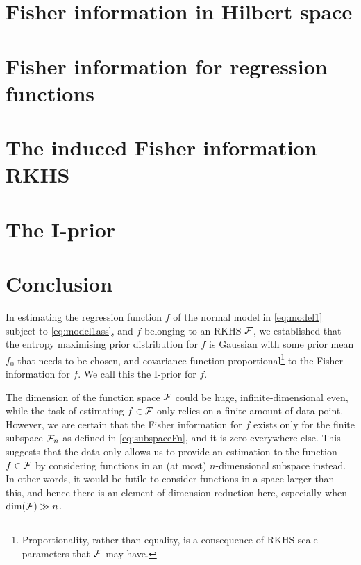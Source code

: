 \documentclass[a4paper,showframe,11pt]{report}
\begin{document}
\section{Fisher information in Hilbert space}
\label{sec:fihilbert}

%

\section{Fisher information for regression functions}
\label{sec:firegfun}


\section{The induced Fisher information RKHS}
\label{sec:inducedFisherRKHS}


\section{The I-prior}


\section{Conclusion}

In estimating the regression function $f$ of the normal model in \cref{eq:model1} subject to \cref{eq:model1ass}, and $f$ belonging to an RKHS ${\mathcal F}$, we established that the entropy maximising prior distribution for $f$ is Gaussian with some prior mean $f_0$ that needs to be chosen, and covariance function proportional\footnote{Proportionality, rather than equality, is a consequence of RKHS scale parameters that ${\mathcal F}$ may have.} to the Fisher information for $f$.
We call this the I-prior for $f$.

The dimension of the function space ${\mathcal F}$ could be huge, infinite-dimensional even, while the task of estimating $f\in{\mathcal F}$ only relies on a finite amount of data point.
However, we are certain that the Fisher information for $f$ exists only for the finite subspace ${\mathcal F}_n$ as defined in \cref{eq:subspaceFn}, and it is zero everywhere else.
This suggests that the data only allows us to provide an estimation to the function $f\in{\mathcal F}$ by considering functions in an (at most) $n$-dimensional subspace instead.
In other words, it would be futile to consider functions in a space larger than this, and hence there is an element of dimension reduction here, especially when $\dim({\mathcal F}) \gg n$.
\end{document}
